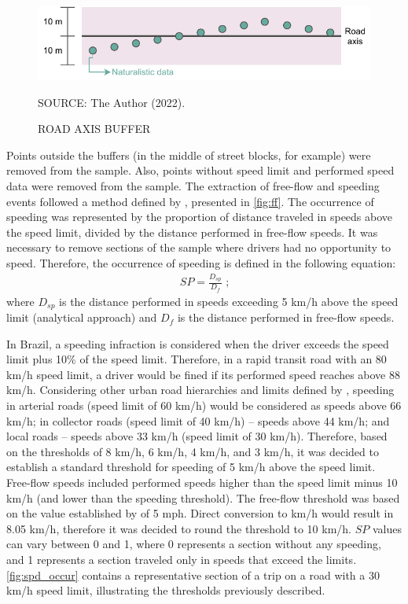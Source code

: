\begin{figure}[!htbp]
    \centering\footnotesize
    \captionsetup{font=footnotesize}
    \caption{ROAD AXIS BUFFER}
    \includegraphics{fig/buffer.pdf}
    \label{fig:buffer}
    \par SOURCE: The Author (2022).
\end{figure}

Points outside the buffers (in the middle of street blocks, for example) were removed from the sample. Also, points without speed limit and performed speed data were removed from the sample. The extraction of free-flow and speeding events followed a method defined by \textcite{Richard2013}, presented in \autoref{fig:ff}. The occurrence of speeding was represented by the proportion of distance traveled in speeds above the speed limit, divided by the distance performed in free-flow speeds. It was necessary to remove sections of the sample where drivers had no opportunity to speed. Therefore, the occurrence of speeding is defined in the following equation: \begin{align}
    SP = \frac{D_{sp}}{D_{f}} \mbox{ ;} 
    \label{eq:sp}
\end{align} where $D_{sp}$ is the distance performed in speeds exceeding 5 km/h above the speed limit (analytical approach) and $D_{f}$ is the distance performed in free-flow speeds. 

In Brazil, a speeding infraction is considered when the driver exceeds the speed limit plus 10\% of the speed limit. Therefore, in a rapid transit road with an 80 km/h speed limit, a driver would be fined if its performed speed reaches above 88 km/h. Considering other urban road hierarchies and limits defined by \textcite{Brasil1997}, speeding in arterial roads (speed limit of 60 km/h) would be considered as speeds above 66 km/h; in collector roads (speed limit of 40 km/h) – speeds above 44 km/h; and local roads – speeds above 33 km/h (speed limit of 30 km/h). Therefore, based on the thresholds of 8 km/h, 6 km/h, 4 km/h, and 3 km/h, it was decided to establish a standard threshold for speeding of 5 km/h above the speed limit. Free-flow speeds included performed speeds higher than the speed limit minus 10 km/h (and lower than the speeding threshold). The free-flow threshold was based on the value established by \textcite{Richard2017} of 5 mph. Direct conversion to km/h would result in 8.05 km/h, therefore it was decided to round the threshold to 10 km/h. $SP$ values can vary between 0 and 1, where 0 represents a section without any speeding, and 1 represents a section traveled only in speeds that exceed the limits. \autoref{fig:spd_occur} contains a representative section of a trip on a road with a 30 km/h speed limit, illustrating the thresholds previously described.   

